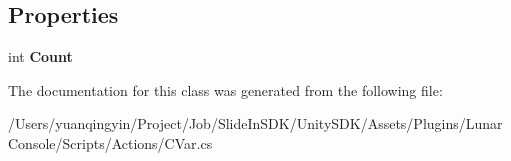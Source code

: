 \subsection*{Properties}
\begin{DoxyCompactItemize}
\item 
\mbox{\label{class_lunar_console_plugin_1_1_c_var_list_a9f086b9f447a9450f658657bf0890ef1}} 
int {\bfseries Count}
\end{DoxyCompactItemize}


The documentation for this class was generated from the following file\+:\begin{DoxyCompactItemize}
\item 
/\+Users/yuanqingyin/\+Project/\+Job/\+Slide\+In\+S\+D\+K/\+Unity\+S\+D\+K/\+Assets/\+Plugins/\+Lunar\+Console/\+Scripts/\+Actions/C\+Var.\+cs\end{DoxyCompactItemize}
